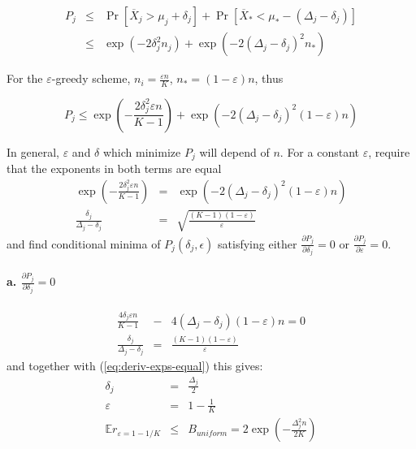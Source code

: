 \documentclass{article}
\newcommand {\IE} {\ensuremath {\mathbb{E}}}
\begin{document}
\begin{eqnarray}
P_j&\le&\Pr[\overline X_j>\mu_j+\delta_j]+\Pr[\overline X_*<\mu_*-(\Delta_j-\delta_j)]\nonumber\\
   &\le&\exp\left(-2\delta_j^2n_j\right)+\exp\left(-2(\Delta_j-\delta_j)^2n_*\right)
\end{eqnarray}

For the $\varepsilon$-greedy scheme, $n_i=\frac {\varepsilon n} K$,
$n_*=(1-\varepsilon)n$, thus

\begin{equation}
P_j \le \exp\left(-\frac {2\delta_j^2\varepsilon n} {K-1}\right) +\exp\left(-2(\Delta_j-\delta_j)^2(1-\varepsilon)n\right)
\end{equation}

In general, $\varepsilon$ and $\delta$ which minimize $P_j$ will
depend of $n$. For a constant $\varepsilon$, require that the
exponents in both terms are equal
\begin{eqnarray}
\exp\left(-\frac {2\delta_j^2\varepsilon n} {K-1}\right)
   &=& \exp\left(-2(\Delta_j-\delta_j)^2(1-\varepsilon)n\right)\\
\frac {\delta_j} {\Delta_j - \delta_j}
   &=& \sqrt { \frac {(K-1)(1-\varepsilon)} \varepsilon }
\label{eq:deriv-exps-equal}
\end{eqnarray}
and find conditional minima of $P_j(\delta_j, \epsilon)$ satisfying
either $\frac {\partial P_j} {\partial \delta_j}=0$ or $\frac {\partial P_j}
{\partial \varepsilon}=0$. 

\vspace{1em}
\paragraph{a. {\large $\frac {\partial P_j} {\partial \delta_j}=0$}}

\begin{eqnarray*}
\frac {4\delta_j\varepsilon n} {K-1}
  &-& 4(\Delta_j-\delta_j)(1-\varepsilon)n=0\\
\frac {\delta_j} {\Delta_j-\delta_j}&=&{ \frac {(K-1)(1-\varepsilon)} \varepsilon }
\end{eqnarray*}
and together with (\ref{eq:deriv-exps-equal}) this gives:
\begin{eqnarray}
\delta_j&=&\frac {\Delta_j} 2\nonumber\\
\varepsilon&=&1-\frac 1 K\nonumber\\
\IE r_{\varepsilon=1-1/K}&\le&B_{uniform}=2\exp\left(-\frac {\Delta_j^2n} {2K}\right)
\label{eq:deriv-uniform-sampling}
\end{eqnarray}
\end{document}
